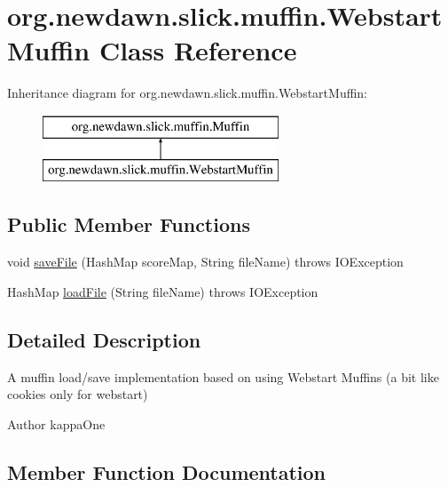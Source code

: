 \hypertarget{classorg_1_1newdawn_1_1slick_1_1muffin_1_1_webstart_muffin}{}\section{org.\+newdawn.\+slick.\+muffin.\+Webstart\+Muffin Class Reference}
\label{classorg_1_1newdawn_1_1slick_1_1muffin_1_1_webstart_muffin}
Inheritance diagram for org.\+newdawn.\+slick.\+muffin.\+Webstart\+Muffin\+:\begin{figure}[H]
\begin{center}
\leavevmode
\includegraphics[height=2.000000cm]{classorg_1_1newdawn_1_1slick_1_1muffin_1_1_webstart_muffin}
\end{center}
\end{figure}
\subsection*{Public Member Functions}
\begin{DoxyCompactItemize}
\item 
void \mbox{\hyperlink{classorg_1_1newdawn_1_1slick_1_1muffin_1_1_webstart_muffin_a4109511b5120d8588fcb4543202d9763}{save\+File}} (Hash\+Map score\+Map, String file\+Name)  throws I\+O\+Exception 
\item 
Hash\+Map \mbox{\hyperlink{classorg_1_1newdawn_1_1slick_1_1muffin_1_1_webstart_muffin_a671e964aa3e400ae2c9d2a4d6a9ebeef}{load\+File}} (String file\+Name)  throws I\+O\+Exception 
\end{DoxyCompactItemize}


\subsection{Detailed Description}
A muffin load/save implementation based on using Webstart Muffins (a bit like cookies only for webstart)

\begin{DoxyAuthor}{Author}
kappa\+One 
\end{DoxyAuthor}


\subsection{Member Function Documentation}
\mbox{\label{classorg_1_1newdawn_1_1slick_1_1muffin_1_1_webstart_muffin_a671e964aa3e400ae2c9d2a4d6a9ebeef}} 
